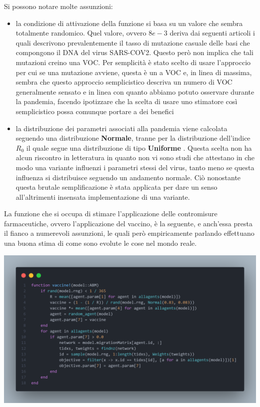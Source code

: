 Si possono notare molte assunzioni:
\begin{itemize}
	\item la condizione di attivazione della funzione si basa su un valore
	che sembra totalmente randomico. Quel valore, ovvero $8e-3$ deriva dai
	seguenti articoli \cite{Markov2023} \cite{https://doi.org/10.1002/jmv.27331} \cite{Abavisani2022}
	i quali descrivono prevalentemente il tasso di mutazione casuale delle basi che compongono
	il DNA del virus SARS-COV2. Questo però non implica che tali mutazioni 
	creino una VOC. Per semplicità è stato scelto di usare l'approccio per cui
	se una mutazione avviene, questa è un a VOC e, in linea di massima, sembra che 
	questo approccio semplicistico descriva un numero di VOC generalmente sensato e 
	in linea con quanto abbiamo potuto osservare durante la pandemia, facendo ipotizzare che 
	la scelta di usare uno stimatore così semplicistico possa comunque portare a dei benefici
	\item la distribuzione dei parametri associati alla pandemia viene calcolata
	seguendo una distribuzione \textbf{Normale}, tranne per la distribuzione dell'indice $R_0$
	il quale segue una distribuzione di tipo \textbf{Uniforme} \cite{wiki:Numero_di_riproduzione_di_base}.
	Questa scelta non ha alcun riscontro in letteratura in quanto non vi sono studi 
	che attestano in che modo una variante influenzi i parametri stessi del virus, 
	tanto meno se questa influenza si distribuisce seguendo un andamento normale. 
	Ciò nonostante questa brutale semplificazione è stata applicata per dare un senso 
	all'altrimenti insensata implementazione di una variante.
\end{itemize}

La funzione che si occupa di stimare l'applicazione delle contromisure farmaceutiche, 
ovvero l'applicazione del vaccino, è la seguente, e anch'essa presta il fianco 
a numerevoli assunzioni, le quali però empiricamente parlando
effettuano una buona stima di come sono evolute le cose nel mondo reale.

\begin{minipage}{\linewidth}
	\centering
	\includegraphics[width=\textwidth]{img/vaccine.png}
	\label{fig:vaccine}
\end{minipage}

